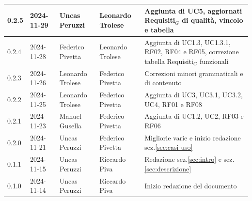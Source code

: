 \documentclass[11pt]{article}
\begin{document}
\begin{tabularx}{\textwidth}{|l|l|l|l|X|}
\hline
0.2.5 & 2024-11-29 & Uncas Peruzzi & Leonardo Trolese & Aggiunta di UC5, aggiornati Requisiti$_G$ di qualità, vincolo e tabella \\
\hline
0.2.4 & 2024-11-28 & Federico Pivetta & Leonardo Trolese & Aggiunta di UC1.3, UC1.3.1, RF02, RF04 e RF05, correzione tabella Requisiti$_G$ funzionali \\
\hline
0.2.3 & 2024-11-26 & Leonardo Trolese  & Federico Pivetta & Correzioni minori grammaticali e di contenuto \\
\hline
0.2.2 & 2024-11-25 & Leonardo Trolese  & Federico Pivetta & Aggiunta di UC3, UC3.1, UC3.2, UC4, RF01 e RF08 \\
\hline
0.2.1 & 2024-11-23 & Manuel Gusella  & Federico Pivetta & Aggiunta di UC1.2, UC2, RF03 e RF06\\
\hline
0.2.0 & 2024-11-21 & Uncas Peruzzi  & Federico Pivetta & Migliorie varie e inizio redazione sez.\ref{sec:casi-uso} \\
\hline
0.1.1 & 2024-11-15 & Uncas Peruzzi  & Riccardo Piva & Redazione sez.\ref{sec:intro} e sez.\ref{sec:descrizione} \\
\hline
0.1.0 & 2024-11-14 & Uncas Peruzzi  & Riccardo Piva & Inizio redazione del documento\\
\hline
\end{tabularx}

\newpage
\tableofcontents
\newpage
\listoffigures
\newpage
\listoftables
\end{document}
